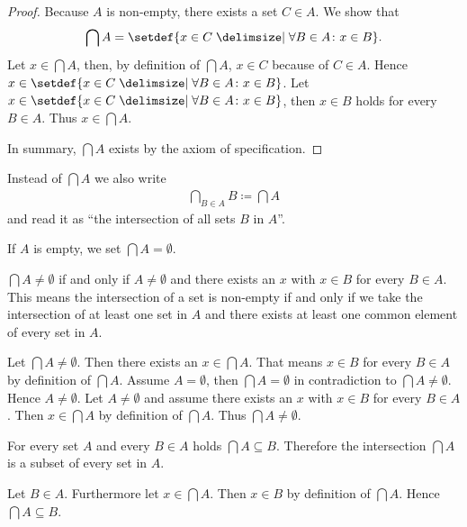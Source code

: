 \begin{proof}
    Because $A$ is non-empty, there exists a set $C\in A$. We show that
    \begin{align}\bigcap A=\setdef{x\in C\given \forall B\in A\colon x\in B}.\end{align}
    \proofsubset Let $x\in\bigcap A$, then, by definition of $\bigcap A$, $x\in C$ because of $C\in A$. Hence $x\in\setdef{x\in C\given \forall B\in A\colon x\in B}$.
    \proofsupset Let $x\in\setdef{x\in C\given \forall B\in A\colon x\in B}$, then $x\in B$ holds for every $B\in A$. Thus $x\in\bigcap A$.

    In summary, $\bigcap A$ exists by the axiom of specification.
\end{proof}

\begin{remarks}
    \begin{remarkenumerate}
        \item\label{remark:sets:intersection_notation} Instead of $\bigcap A$ we also write \begin{align}\bigcap_{B\in A} B\coloneq\bigcap A\end{align} and read it as \enquote{the intersection of all sets $B$ in $A$}.
        \item If $A$ is empty, we set $\bigcap A=\emptyset$.
        \item\label{remark:sets:intersection_non_empty} $\bigcap A\neq\emptyset$ if and only if $A\neq\emptyset$ and there exists an $x$ with $x\in B$ for every $B\in A$. This means the intersection of a set is non-empty if and only if we take the intersection of at least one set in $A$ and there exists at least one common element of every set in $A$.
        \begin{miniproof}
            \proofright Let $\bigcap A\neq\emptyset$. Then there exists an $x\in\bigcap A$. That means $x\in B$ for every $B\in A$ by definition of $\bigcap A$. Assume $A=\emptyset$, then $\bigcap A=\emptyset$ in contradiction to $\bigcap A\neq\emptyset$. Hence $A\neq\emptyset$.
            \proofleft Let $A\neq\emptyset$ and assume there exists an $x$ with $x\in B$ for every $B\in A$. Then $x\in\bigcap A$ by definition of $\bigcap A$. Thus $\bigcap A\neq\emptyset$.
        \end{miniproof}
        \item\label{remark:sets:intersection_subset} For every set $A$ and every $B\in A$ holds $\bigcap A\subseteq B$. Therefore the intersection $\bigcap A$ is a subset of every set in $A$.
        \begin{miniproof}
            Let $B\in A$. Furthermore let $x\in \bigcap A$. Then $x\in B$ by definition of $\bigcap A$. Hence $\bigcap A\subseteq B$.
        \end{miniproof}
    \end{remarkenumerate}
\end{remarks}

